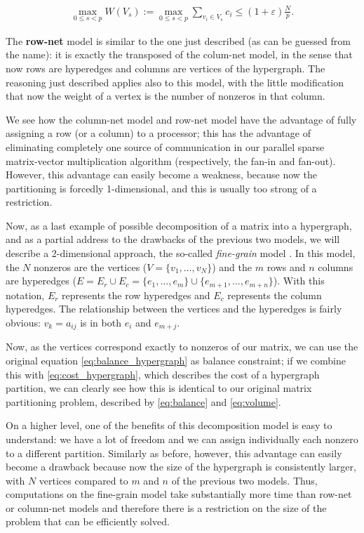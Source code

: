 \begin{align}
	\max_{0 \leq s <p}	W(V_s) := \max_{0 \leq s <p} \sum_{v_i \in V_s} c_i \leq (1 + \varepsilon) \frac{N}{p}.
	\label{eq:balance_columnet}
\end{align}

The \textbf{row-net} model is similar to the one just described (as can be guessed from the name): it is exactly the transposed of the colum-net model, in the sense that now rows are hyperedges and columns are vertices of the hypergraph. The reasoning just described applies also to this model, with the little modification that now the weight of a vertex is the number of nonzeros in that column.

We see how the column-net model and row-net model have the advantage of fully assigning a row (or a column) to a processor; this has the advantage of eliminating completely one source of communication in our parallel sparse matrix-vector multiplication algorithm (respectively, the fan-in and fan-out). However, this advantage can easily become a weakness, because now the partitioning is forcedly 1-dimensional, and this is usually too strong of a restriction.

Now, as a last example of possible decomposition of a matrix into a hypergraph, and as a partial address to the drawbacks of the previous two models, we will describe a 2-dimensional approach, the so-called \emph{fine-grain} model \cite{hypergraph_finegrain}. In this model, the $N$ nonzeros are the vertices ($V = \{ v_1,\dots,v_N\}$) and the $m$ rows and $n$ columns are hyperedges ($E = E_r \cup E_c = \{ e_1,\dots,e_m \} \cup \{e_{m+1},\dots,e_{m+n}\}$). With this notation, $E_r$ represents the row hyperedges and $E_c$ represents the column hyperedges. The relationship between the vertices and the hyperedges is fairly obvious: $v_k = a_{ij}$ is in both $e_i$ and $e_{m+j}$.

Now, as the vertices correspond exactly to nonzeros of our matrix, we can use the original equation \eqref{eq:balance_hypergraph} as balance constraint; if we combine this with \eqref{eq:cost_hypergraph}, which describes the cost of a hypergraph partition, we can clearly see how this is identical to our original matrix partitioning problem, described by \eqref{eq:balance} and \eqref{eq:volume}.

On a higher level, one of the benefits of this decomposition model is easy to understand: we have a lot of freedom and we can assign individually each nonzero to a different partition. Similarly as before, however, this advantage can easily become a drawback because now the size of the hypergraph is consistently larger, with $N$ vertices compared to $m$ and $n$ of the previous two models. Thus, computations on the fine-grain model take substantially more time than row-net or column-net models and therefore there is a restriction on the size of the problem that can be efficiently solved.

